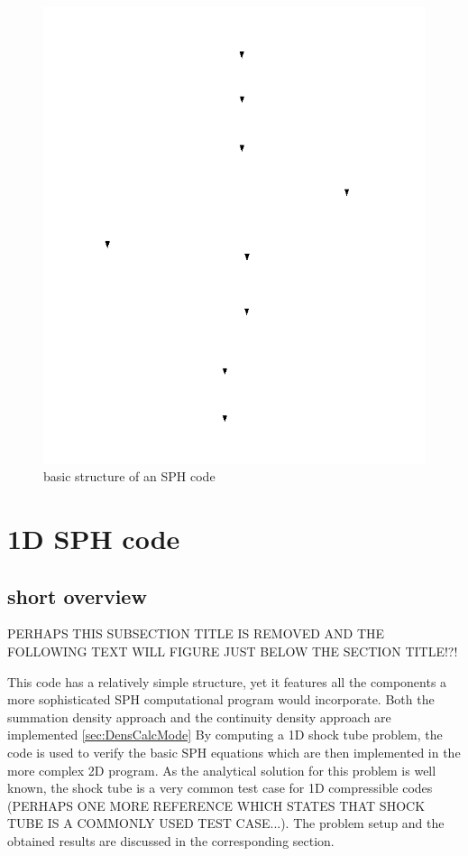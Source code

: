 \documentclass{report}
\begin{document}
\begin{figure}[h]
  \centering
      \includegraphics[width=1.0\textwidth]{Graphics/general_structure_SPH}
  \caption{basic structure of an SPH code}
  \label{fig:BasicSphCode}
\end{figure}





\section{1D SPH code}

\subsection{short overview}
PERHAPS THIS SUBSECTION TITLE IS REMOVED AND THE FOLLOWING TEXT WILL FIGURE JUST BELOW THE SECTION TITLE!?!

This code has a relatively simple structure, yet it features all the components a more sophisticated SPH computational program would incorporate. Both the summation density approach and the continuity density approach are implemented \ref{sec:DensCalcMode} By computing a 1D shock tube problem, the code is used to verify the basic SPH equations which are then implemented in the more complex 2D program. As the analytical solution for this problem is well known, the shock tube is a very common test case for 1D compressible codes \cite{Sod1978} (PERHAPS ONE MORE REFERENCE WHICH STATES THAT SHOCK TUBE IS A COMMONLY USED TEST CASE...). The problem setup and the obtained results are discussed in the corresponding section.
\end{document}
